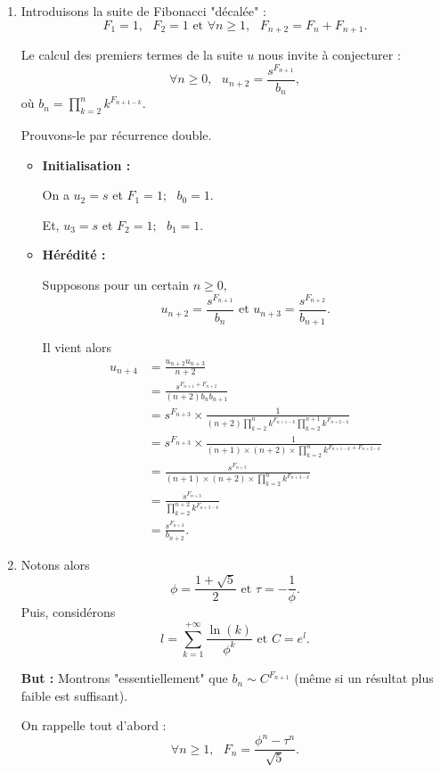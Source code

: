 \begin{enumerate}
\item Introduisons la suite de Fibonacci "décalée" :
$$F_{1}=1,\mbox { }F_{2}=1 \mbox{ et } \forall n\geq 1,\mbox{ } F_{n+2}=F_{n}+F_{n+1}.$$

Le calcul des premiers termes de la suite $u$ nous invite à conjecturer : $$\forall n\geq 0,\mbox{ } u_{n+2}=\frac{s^{F_{n+1}}}{b_{n}},$$ où $\displaystyle b_{n}=\prod_{k=2}^{n}k^{F_{n+1-k}}.$

Prouvons-le par récurrence double.

\begin{itemize}
 \item \textbf{Initialisation :}

On a $u_{2}=s$ et $F_{1}=1;\mbox{ }b_{0}=1.$

Et, $u_{3}=s$ et $F_{2}=1;\mbox{ }b_{1}=1.$

\item \textbf{Hérédité : }

Supposons pour un certain $n\geq 0,$ $$u_{n+2}=\frac{s^{F_{n+1}}}{b_{n}} \mbox{ et } u_{n+3}=\frac{s^{F_{n+2}}}{b_{n+1}}.$$

Il vient alors 
\begin{align*}
u_{n+4} & =\frac{u_{n+2}u_{n+3}}{n+2}\\
& =\frac{s^{F_{n+1}+F_{n+2}}}{(n+2)b_{n}b_{n+1}}\\
& =s^{F_{n+3}}\times \frac{1}{(n+2)\prod_{k=2}^{n}k^{F_{n+1-k}}\prod_{k=2}^{n+1}k^{F_{n+2-k}}}\\
& = s^{F_{n+3}}\times \frac{1}{(n+1) \times (n+2)\times \prod_{k=2}^{n}k^{F_{n+1-k}+F_{n+2-k}}}\\
& =\frac{s^{F_{n+3}}}{(n+1)\times (n+2)\times \prod_{k=2}^{n}k^{F_{n+3-k}}}\\
& =\frac{s^{F_{n+3}}}{\prod_{k=2}^{n+2}k^{F_{n+3-k}}}\\
& = \frac{s^{F_{n+3}}}{b_{n+2}}.
\end{align*}
\end{itemize}

\item Notons alors $$\phi=\frac{1+\sqrt{5}}{2} \mbox{ et } \tau=-\frac{1}{\phi}.$$
Puis, considérons $$l=\sum_{k=1}^{+\infty}\frac{\ln(k)}{\phi^{k}} \mbox{ et } C=e^{l}.$$

\textbf{But : } Montrons "essentiellement" que $\displaystyle b_{n}\sim C^{F_{n+1}}$ (même si un résultat plus faible est suffisant).

On rappelle tout d'abord : $$\forall n\geq 1,\mbox{ } F_{n}=\frac{\phi^{n}-\tau^{n}}{\sqrt{5}}.$$


\end{enumerate}
